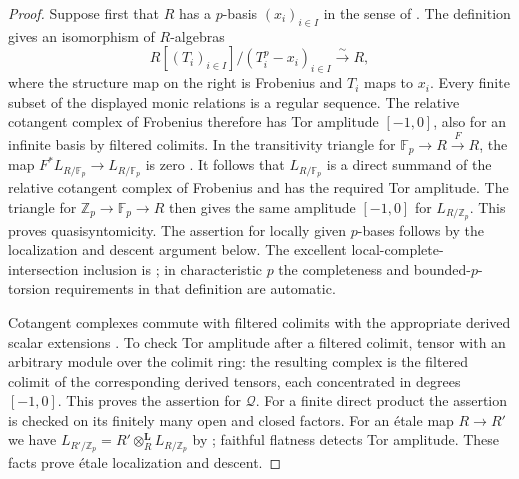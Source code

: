 \begin{proof}
Suppose first that $R$ has a $p$-basis $(x_i)_{i\in I}$ in the
sense of \cite[Section 2, equation (2.1)]{B:LauDivided}.
The definition gives an isomorphism of $R$-algebras
\[
 R[(T_i)_{i\in I}]/(T_i^p-x_i)_{i\in I}
 \xrightarrow{\ \sim\ } R,
\]
where the structure map on the right is Frobenius and $T_i$ maps
to $x_i$. Every finite subset of the displayed monic relations
is a regular sequence. The relative cotangent complex of
Frobenius therefore has Tor amplitude $[-1,0]$, also for an
infinite basis by filtered colimits. In the transitivity triangle
for $\mathbb F_p\to R\xrightarrow{F}R$, the map
$F^*L_{R/\mathbb F_p}\to L_{R/\mathbb F_p}$ is zero
\cite[Lemma 92.10.2, Tag 0G5Z]{B:StacksCotangent}.
It follows that $L_{R/\mathbb F_p}$ is a direct summand of the
relative cotangent complex of Frobenius and has the required Tor
amplitude. The triangle for $\mathbb Z_p\to\mathbb F_p\to R$
then gives the same amplitude $[-1,0]$ for $L_{R/\mathbb Z_p}$.
This proves quasisyntomicity. The assertion for locally given
$p$-bases follows by the localization and descent argument below.
The excellent local-complete-intersection inclusion is
\cite[Example 3.17(1)]{B:ALB}; in characteristic $p$ the completeness
and bounded-$p$-torsion requirements in that definition are automatic.

Cotangent complexes commute with filtered colimits with the
appropriate derived scalar extensions
\cite[Lemma 92.3.4, Tag 08S9]{B:StacksCotangent}.
To check Tor amplitude after a filtered colimit, tensor with an
arbitrary module over the colimit ring: the resulting complex is
the filtered colimit of the corresponding derived tensors, each
concentrated in degrees $[-1,0]$. This proves the assertion for
$\mathcal Q$. For a finite direct product the assertion is checked
on its finitely many open and closed factors. For an \'etale map
$R\to R'$ we have
$L_{R'/\mathbb Z_p}=R'\otimes_R^{\mathbf L}L_{R/\mathbb Z_p}$
by \cite[Lemma 92.8.4, Tag 08R2]{B:StacksCotangent};
faithful flatness detects Tor amplitude. These facts prove \'etale
localization and descent.


\end{proof}
